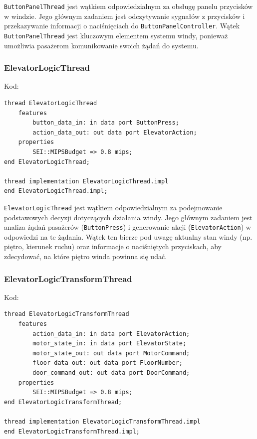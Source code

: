 \documentclass{article}
\begin{document}
    \texttt{ButtonPanelThread} jest wątkiem odpowiedzialnym za obsługę panelu przycisków w windzie. Jego głównym zadaniem jest odczytywanie sygnałów z przycisków i przekazywanie informacji o naciśnięciach do \texttt{ButtonPanelController}. Wątek \texttt{ButtonPanelThread} jest kluczowym elementem systemu windy, ponieważ umożliwia pasażerom komunikowanie swoich żądań do systemu.

    
    \subsubsection{ElevatorLogicThread}

    Kod:
    
    \begin{lstlisting}[basicstyle=\ttfamily, keywordstyle=\bfseries]
thread ElevatorLogicThread
    features
        button_data_in: in data port ButtonPress;
        action_data_out: out data port ElevatorAction;
    properties
        SEI::MIPSBudget => 0.8 mips;
end ElevatorLogicThread;

thread implementation ElevatorLogicThread.impl
end ElevatorLogicThread.impl;
    \end{lstlisting}

    \texttt{ElevatorLogicThread} jest wątkiem odpowiedzialnym za podejmowanie podstawowych decyzji dotyczących działania windy. Jego głównym zadaniem jest analiza żądań pasażerów (\texttt{ButtonPress}) i generowanie akcji (\texttt{ElevatorAction}) w odpowiedzi na te żądania. Wątek ten bierze pod uwagę aktualny stan windy (np. piętro, kierunek ruchu) oraz informacje o naciśniętych przyciskach, aby zdecydować, na które piętro winda powinna się udać.



    \subsubsection{ElevatorLogicTransformThread}

    Kod:
    
    \begin{lstlisting}[basicstyle=\ttfamily, keywordstyle=\bfseries]
thread ElevatorLogicTransformThread
    features
        action_data_in: in data port ElevatorAction;
        motor_state_in: in data port ElevatorState;
        motor_state_out: out data port MotorCommand;
        floor_data_out: out data port FloorNumber;
        door_command_out: out data port DoorCommand;
    properties
        SEI::MIPSBudget => 0.8 mips;
end ElevatorLogicTransformThread;

thread implementation ElevatorLogicTransformThread.impl
end ElevatorLogicTransformThread.impl;
    \end{lstlisting}
\end{document}
